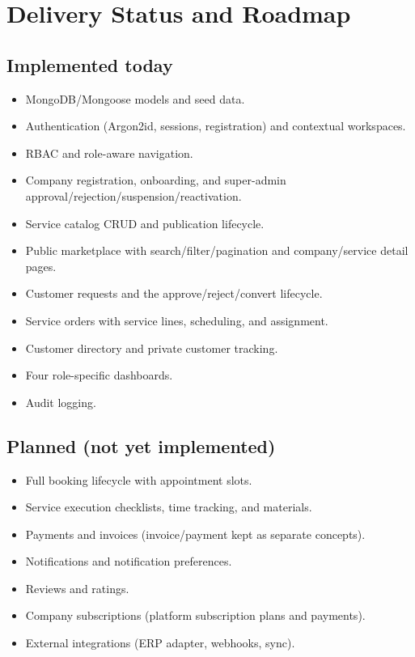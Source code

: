 \documentclass[11pt,a4paper]{article}
\begin{document}
\section{Delivery Status and Roadmap}
\label{sec:roadmap}

\subsection{Implemented today}
\begin{itemize}[leftmargin=2em, itemsep=2pt]
  \item MongoDB/Mongoose models and seed data.
  \item Authentication (Argon2id, sessions, registration) and contextual workspaces.
  \item RBAC and role-aware navigation.
  \item Company registration, onboarding, and super-admin approval/rejection/suspension/reactivation.
  \item Service catalog CRUD and publication lifecycle.
  \item Public marketplace with search/filter/pagination and company/service detail pages.
  \item Customer requests and the approve/reject/convert lifecycle.
  \item Service orders with service lines, scheduling, and assignment.
  \item Customer directory and private customer tracking.
  \item Four role-specific dashboards.
  \item Audit logging.
\end{itemize}

\subsection{Planned (not yet implemented)}
\begin{itemize}[leftmargin=2em, itemsep=2pt]
  \item Full booking lifecycle with appointment slots.
  \item Service execution checklists, time tracking, and materials.
  \item Payments and invoices (invoice/payment kept as separate concepts).
  \item Notifications and notification preferences.
  \item Reviews and ratings.
  \item Company subscriptions (platform subscription plans and payments).
  \item External integrations (ERP adapter, webhooks, sync).
\end{itemize}
\end{document}
